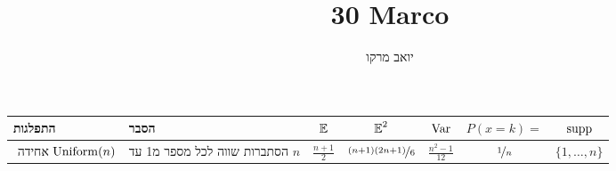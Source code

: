 \documentclass[8pt,twocolumn]{extarticle}
\title{30 Marco}
\author{יואב מרקו}
\begin{document}
\ifxetex
{\centering
  { \begin{minipage}{\columnwidth}
      \centering
      \begin{sideways}
        \begin{tabular}{ p{3cm} | p{4cm} | c | c | c | c | c}
          התפלגות  & הסבר
          & $\operatorname*{\mathbb{E}}$ & $\operatorname*{\mathbb{E}}^2$ & $\operatorname{Var}$ & $P(x=k) =$ & $\operatorname{supp}$ \\
          \hline
          אחידה \hfill‏ ‎\(\operatorname{Uniform}(n)\)
                   & הסתברות שווה לכל מספר מ1 עד ‎\(n\)
          & ‎\(\frac{n+1}{2}\)
                  & ‎\(\nicefrac{(n+1)(2n+1)}{6}\)
                            & ‎\(\frac{n^2 -1}{12}\)
                                     & ‎\(\nicefrac{1}{n}\)
                                                  & ‎\(\{1, \dots ,n\}\)\\


\end{tabular}
\end{sideways}
\end{minipage}}}
\end{document}
